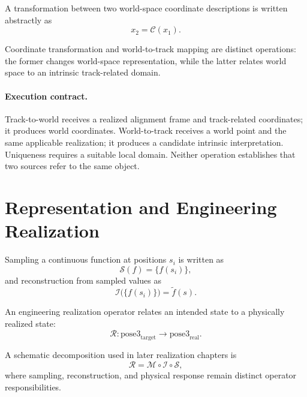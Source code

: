 A transformation between two world-space coordinate descriptions is
written abstractly as
\begin{equation}
x_2=\mathcal C(x_1).
\label{eq:coordinate-transformation}
\end{equation}

Coordinate transformation and world-to-track mapping are distinct
operations: the former changes world-space representation, while the
latter relates world space to an intrinsic track-related domain.

\paragraph{Execution contract.}
Track-to-world receives a realized alignment frame and track-related
coordinates; it produces world coordinates. World-to-track receives a
world point and the same applicable realization; it produces a candidate
intrinsic interpretation. Uniqueness requires a suitable local domain.
Neither operation establishes that two sources refer to the same object.

\section{Representation and Engineering Realization}

Sampling a continuous function at positions \(s_i\) is written as
\begin{equation}
\mathcal S(f)=\{f(s_i)\},
\label{eq:sampling}
\end{equation}
and reconstruction from sampled values as
\begin{equation}
\mathcal I\bigl(\{f(s_i)\}\bigr)=\widetilde f(s).
\label{eq:interpolation}
\end{equation}

An engineering realization operator relates an intended state to a
physically realized state:
\begin{equation}
\mathcal R:
\mathrm{pose3}_{\mathrm{target}}
\longrightarrow
\mathrm{pose3}_{\mathrm{real}}.
\label{eq:realization-operator}
\end{equation}

A schematic decomposition used in later realization chapters is
\begin{equation}
\mathcal R
=
\mathcal M\circ\mathcal I\circ\mathcal S,
\label{eq:core-realization-decomposition}
\end{equation}
where sampling, reconstruction, and physical response remain distinct
operator responsibilities.


